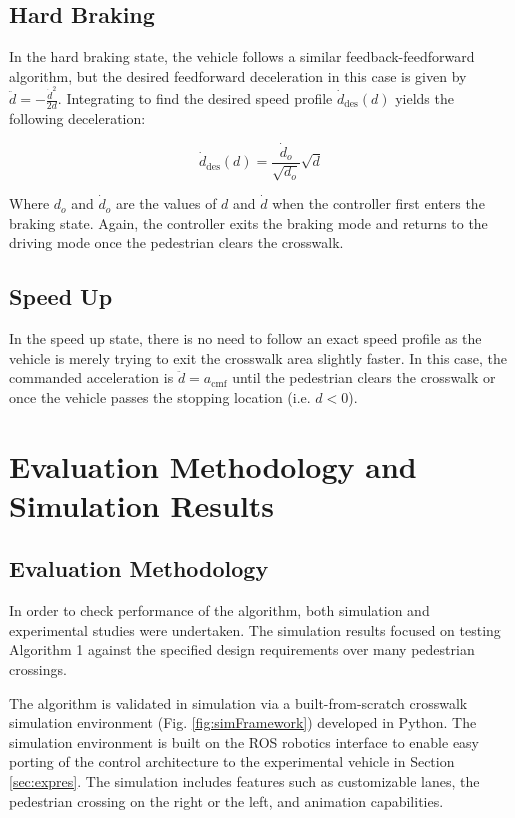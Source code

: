\documentclass[letterpaper, 10 pt, conference]{ieeeconf}  %
\begin{document}
\subsection{Hard Braking}

In the hard braking state, the vehicle follows a similar feedback-feedforward algorithm, but the desired feedforward deceleration in this case is given by $\ddot{d} = -\frac{\dot{d}^2}{2d}$. Integrating to find the desired speed profile $\dot{d}_\mathrm{des}(d)$ yields the following deceleration: 

\begin{equation}
\dot{d}_\mathrm{des}(d) = \frac{\dot{d}_o}{\sqrt{d_o}}\sqrt{d}
\end{equation}     

Where $d_o$ and $\dot{d}_o$ are the values of $d$ and $\dot{d}$ when the controller first enters the braking state. Again, the controller exits the braking mode and returns to the driving mode once the pedestrian clears the crosswalk. 

\subsection{Speed Up}

In the speed up state, there is no need to follow an exact speed profile as the vehicle is merely trying to exit the crosswalk area slightly faster. In this case, the commanded acceleration is $\ddot{d} = a_\mathrm{cmf}$ until the pedestrian clears the crosswalk or once the vehicle passes the stopping location (i.e. $d< 0$). 

\section{Evaluation Methodology and Simulation Results}

\subsection{Evaluation Methodology}

In order to check performance of the algorithm, both simulation and experimental studies were undertaken. The simulation results focused on testing Algorithm 1 against the specified design requirements over many pedestrian crossings. 

The algorithm is validated in simulation via a built-from-scratch crosswalk simulation environment (Fig. \ref{fig:simFramework}) developed in Python. The simulation environment is built on the ROS robotics interface to enable easy porting of the control architecture to the experimental vehicle in Section \ref{sec:expres}. The simulation includes features such as customizable lanes, the pedestrian crossing on the right or the left, and animation capabilities.   
\end{document}
